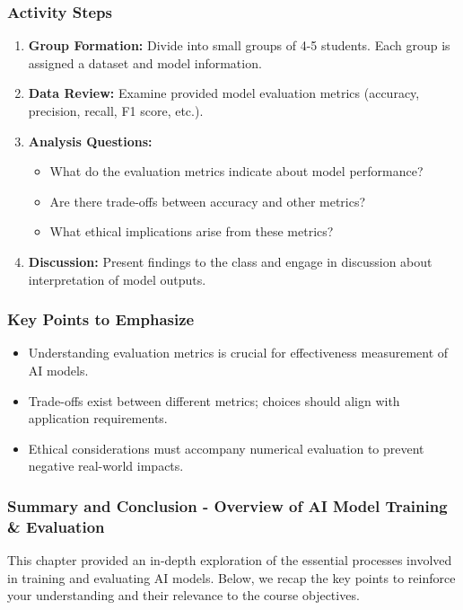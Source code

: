 \documentclass[aspectratio=169]{beamer}
\begin{document}
\begin{frame}[fragile]
    \frametitle{Activity Steps}
    \begin{enumerate}
        \item \textbf{Group Formation:} Divide into small groups of 4-5 students. Each group is assigned a dataset and model information.
        \item \textbf{Data Review:} Examine provided model evaluation metrics (accuracy, precision, recall, F1 score, etc.).
        \item \textbf{Analysis Questions:}
        \begin{itemize}
            \item What do the evaluation metrics indicate about model performance?
            \item Are there trade-offs between accuracy and other metrics?
            \item What ethical implications arise from these metrics?
        \end{itemize}
        \item \textbf{Discussion:} Present findings to the class and engage in discussion about interpretation of model outputs.
    \end{enumerate}
\end{frame}

\begin{frame}[fragile]
    \frametitle{Key Points to Emphasize}
    \begin{itemize}
        \item Understanding evaluation metrics is crucial for effectiveness measurement of AI models.
        \item Trade-offs exist between different metrics; choices should align with application requirements.
        \item Ethical considerations must accompany numerical evaluation to prevent negative real-world impacts.
    \end{itemize}
\end{frame}

\begin{frame}[fragile]
    \frametitle{Summary and Conclusion - Overview of AI Model Training \& Evaluation}
    This chapter provided an in-depth exploration of the essential processes involved in training and evaluating AI models. Below, we recap the key points to reinforce your understanding and their relevance to the course objectives.
\end{frame}
\end{document}

